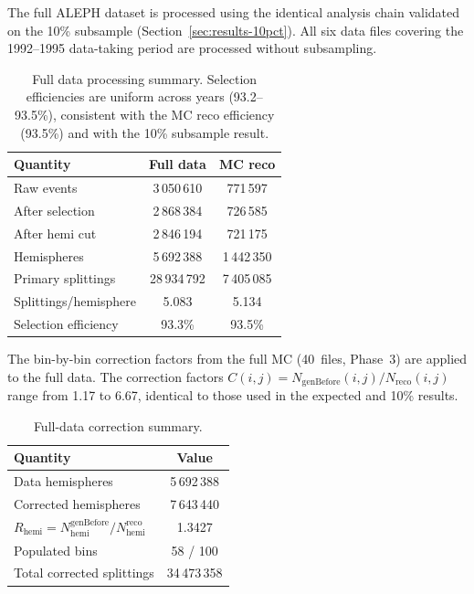 \documentclass[11pt,a4paper]{article}
\begin{document}
The full ALEPH dataset is processed using the identical analysis chain
validated on the 10\% subsample (Section~\ref{sec:results-10pct}).
All six data files covering the 1992--1995 data-taking period are
processed without subsampling.

\begin{table}[htbp]
\centering
\caption{Full data processing summary.  Selection efficiencies are
  uniform across years (93.2--93.5\%), consistent with the MC reco
  efficiency (93.5\%) and with the 10\% subsample result.}
\label{tbl:full-summary}
\begin{tabular}{lcc}
\toprule
Quantity & Full data & MC reco \\
\midrule
Raw events & 3\,050\,610 & 771\,597 \\
After selection & 2\,868\,384 & 726\,585 \\
After hemi cut & 2\,846\,194 & 721\,175 \\
Hemispheres & 5\,692\,388 & 1\,442\,350 \\
Primary splittings & 28\,934\,792 & 7\,405\,085 \\
Splittings/hemisphere & 5.083 & 5.134 \\
Selection efficiency & 93.3\% & 93.5\% \\
\bottomrule
\end{tabular}
\end{table}

The bin-by-bin correction factors from the full MC (40~files, Phase~3)
are applied to the full data.  The correction factors
$C(i,j) = N_\text{genBefore}(i,j) / N_\text{reco}(i,j)$ range from 1.17
to 6.67, identical to those used in the expected and 10\% results.

\begin{table}[htbp]
\centering
\caption{Full-data correction summary.}
\label{tbl:full-correction}
\begin{tabular}{lc}
\toprule
Quantity & Value \\
\midrule
Data hemispheres & 5\,692\,388 \\
Corrected hemispheres & 7\,643\,440 \\
$R_\text{hemi} = N_\text{hemi}^\text{genBefore} / N_\text{hemi}^\text{reco}$ & 1.3427 \\
Populated bins & 58 / 100 \\
Total corrected splittings & 34\,473\,358 \\
\bottomrule
\end{tabular}
\end{table}
\end{document}
